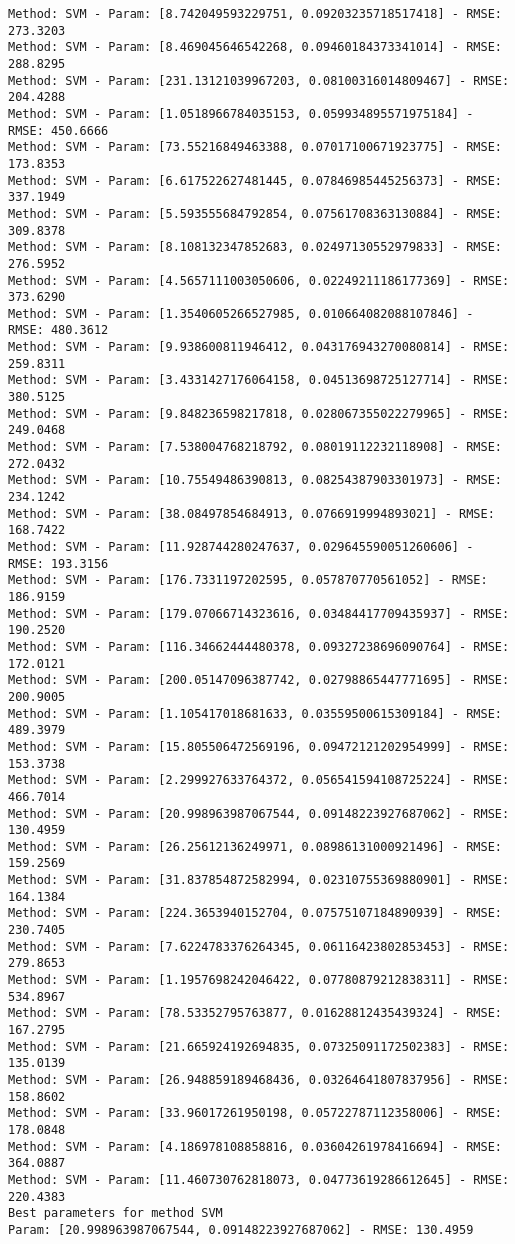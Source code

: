 \documentclass[11pt]{article}
\begin{document}
\begin{Verbatim}[commandchars=\\\{\},fontsize=\small]
Method: SVM - Param: [8.742049593229751, 0.09203235718517418] - RMSE: 273.3203
Method: SVM - Param: [8.469045646542268, 0.09460184373341014] - RMSE: 288.8295
Method: SVM - Param: [231.13121039967203, 0.08100316014809467] - RMSE: 204.4288
Method: SVM - Param: [1.0518966784035153, 0.059934895571975184] - RMSE: 450.6666
Method: SVM - Param: [73.55216849463388, 0.07017100671923775] - RMSE: 173.8353
Method: SVM - Param: [6.617522627481445, 0.07846985445256373] - RMSE: 337.1949
Method: SVM - Param: [5.593555684792854, 0.07561708363130884] - RMSE: 309.8378
Method: SVM - Param: [8.108132347852683, 0.02497130552979833] - RMSE: 276.5952
Method: SVM - Param: [4.5657111003050606, 0.02249211186177369] - RMSE: 373.6290
Method: SVM - Param: [1.3540605266527985, 0.010664082088107846] - RMSE: 480.3612
Method: SVM - Param: [9.938600811946412, 0.043176943270080814] - RMSE: 259.8311
Method: SVM - Param: [3.4331427176064158, 0.04513698725127714] - RMSE: 380.5125
Method: SVM - Param: [9.848236598217818, 0.028067355022279965] - RMSE: 249.0468
Method: SVM - Param: [7.538004768218792, 0.08019112232118908] - RMSE: 272.0432
Method: SVM - Param: [10.75549486390813, 0.08254387903301973] - RMSE: 234.1242
Method: SVM - Param: [38.08497854684913, 0.0766919994893021] - RMSE: 168.7422
Method: SVM - Param: [11.928744280247637, 0.029645590051260606] - RMSE: 193.3156
Method: SVM - Param: [176.7331197202595, 0.057870770561052] - RMSE: 186.9159
Method: SVM - Param: [179.07066714323616, 0.03484417709435937] - RMSE: 190.2520
Method: SVM - Param: [116.34662444480378, 0.09327238696090764] - RMSE: 172.0121
Method: SVM - Param: [200.05147096387742, 0.02798865447771695] - RMSE: 200.9005
Method: SVM - Param: [1.105417018681633, 0.03559500615309184] - RMSE: 489.3979
Method: SVM - Param: [15.805506472569196, 0.09472121202954999] - RMSE: 153.3738
Method: SVM - Param: [2.299927633764372, 0.056541594108725224] - RMSE: 466.7014
Method: SVM - Param: [20.998963987067544, 0.09148223927687062] - RMSE: 130.4959
Method: SVM - Param: [26.25612136249971, 0.08986131000921496] - RMSE: 159.2569
Method: SVM - Param: [31.837854872582994, 0.02310755369880901] - RMSE: 164.1384
Method: SVM - Param: [224.3653940152704, 0.07575107184890939] - RMSE: 230.7405
Method: SVM - Param: [7.6224783376264345, 0.06116423802853453] - RMSE: 279.8653
Method: SVM - Param: [1.1957698242046422, 0.07780879212838311] - RMSE: 534.8967
Method: SVM - Param: [78.53352795763877, 0.01628812435439324] - RMSE: 167.2795
Method: SVM - Param: [21.665924192694835, 0.07325091172502383] - RMSE: 135.0139
Method: SVM - Param: [26.948859189468436, 0.03264641807837956] - RMSE: 158.8602
Method: SVM - Param: [33.96017261950198, 0.05722787112358006] - RMSE: 178.0848
Method: SVM - Param: [4.186978108858816, 0.03604261978416694] - RMSE: 364.0887
Method: SVM - Param: [11.460730762818073, 0.04773619286612645] - RMSE: 220.4383
Best parameters for method SVM
Param: [20.998963987067544, 0.09148223927687062] - RMSE: 130.4959
    \end{Verbatim}
\end{document}
